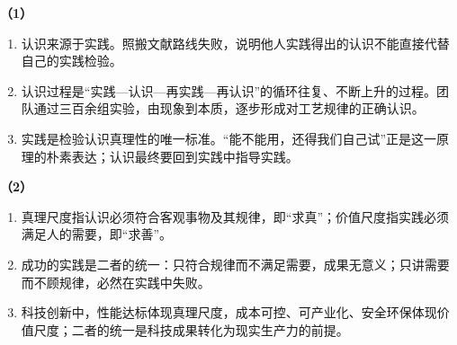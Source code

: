 
\textbf{（1）}
\begin{enumerate}[label=(\arabic*),leftmargin=2.2em,itemsep=2pt,topsep=2pt]
\item 认识来源于实践。照搬文献路线失败，说明他人实践得出的认识不能直接代替自己的实践检验。
\item 认识过程是“实践—认识—再实践—再认识”的循环往复、不断上升的过程。团队通过三百余组实验，由现象到本质，逐步形成对工艺规律的正确认识。
\item 实践是检验认识真理性的唯一标准。“能不能用，还得我们自己试”正是这一原理的朴素表达；认识最终要回到实践中指导实践。
\end{enumerate}

\textbf{（2）}
\begin{enumerate}[label=(\arabic*),leftmargin=2.2em,itemsep=2pt,topsep=2pt]
\item 真理尺度指认识必须符合客观事物及其规律，即“求真”；价值尺度指实践必须满足人的需要，即“求善”。
\item 成功的实践是二者的统一：只符合规律而不满足需要，成果无意义；只讲需要而不顾规律，必然在实践中失败。
\item 科技创新中，性能达标体现真理尺度，成本可控、可产业化、安全环保体现价值尺度；二者的统一是科技成果转化为现实生产力的前提。
\end{enumerate}
